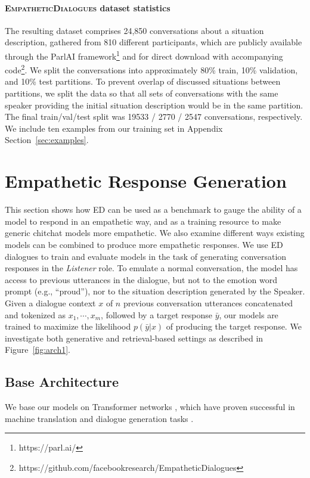 \documentclass[11pt,a4paper]{article}
\newcommand\datasetname{\textsc{EmpatheticDialogues}}
\begin{document}
\paragraph{\datasetname{} dataset statistics}

The resulting dataset comprises 
24,850 conversations about a situation description, gathered from 810 different participants, which are publicly available through the ParlAI framework\footnote{https://parl.ai/} and for direct download with accompanying code\footnote{https://github.com/facebookresearch/EmpatheticDialogues}.
We split the conversations into approximately 80\% train, 10\% validation, and 10\% test partitions.  To prevent overlap of discussed situations between partitions, 
we split the data so that all sets of conversations with the same speaker providing the initial situation description would be in the same partition.  The final train/val/test split was 19533 / 2770 / 2547 conversations, respectively.   We include ten examples from our training set in Appendix Section~\ref{sec:examples}.




\section{Empathetic Response Generation}

This section shows how ED can 
be used as a benchmark to gauge the ability of a model to respond in an empathetic way, and as a training resource to make generic chitchat models more empathetic. We also examine different ways existing models can be combined to produce more empathetic responses.
We use ED dialogues to train and evaluate models in the task of generating conversation responses in the \textit{Listener} role. To emulate a normal conversation, the model has access to previous utterances in the dialogue, but not to the emotion word prompt (e.g., ``proud''), nor to the situation description generated by the Speaker.
Given a dialogue context $x$ of $n$ previous conversation utterances concatenated and tokenized as $x_1, \cdots, x_m$, followed by a target response $\bar{y}$, our models are trained to maximize the likelihood $p(\bar{y}|x)$ of producing the target response. We investigate both generative and retrieval-based settings \citep{lowe2016evaluation} as described in Figure~\ref{fig:arch1}.

\subsection{Base Architecture}
We base our models on Transformer networks \citep{TransformerNets}, which have proven successful in machine translation and dialogue generation tasks \citep{personachat,mazare2018training}. 
\end{document}
